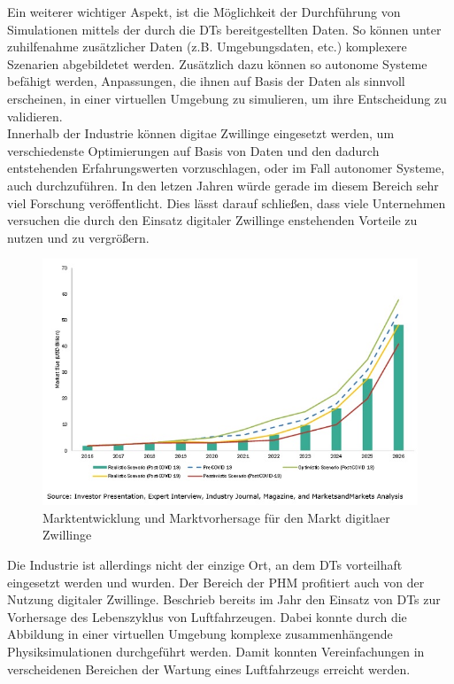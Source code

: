 Ein weiterer wichtiger Aspekt, ist die Möglichkeit der Durchführung von Simulationen mittels der durch die \ac{DT}s bereitgestellten Daten. So können unter zuhilfenahme zusätzlicher Daten (z.B. Umgebungsdaten, etc.) komplexere Szenarien abgebildetet werden. Zusätzlich dazu können so autonome Systeme befähigt werden, Anpassungen, die ihnen auf Basis der Daten als sinnvoll erscheinen, in einer virtuellen Umgebung zu simulieren, um ihre Entscheidung zu validieren. \autocite{rosen2015importance}\\
Innerhalb der Industrie können digitae Zwillinge eingesetzt werden, um verschiedenste Optimierungen auf Basis von Daten und den dadurch entstehenden Erfahrungswerten vorzuschlagen, oder im Fall autonomer Systeme, auch durchzuführen. In den letzen Jahren würde gerade im diesem Bereich sehr viel Forschung veröffentlicht. \autocite[S. 167657]{barricelli2019survey} Dies lässt darauf schließen, dass viele Unternehmen versuchen die durch den Einsatz digitaler Zwillinge enstehenden Vorteile zu nutzen und zu vergrößern. 

\begin{figure}[h]
    \centering
    \includegraphics[width=1.0\linewidth]{img/digital-twin-market12.jpg}
    \caption[Übersicht Marktgröße \ac{DT}]{Marktentwicklung und Marktvorhersage für den Markt digitlaer Zwillinge \autocite{markets2020}}
\end{figure}


Die Industrie ist allerdings nicht der einzige Ort, an dem \ac{DT}s vorteilhaft eingesetzt werden und wurden. Der Bereich der \ac{PHM} profitiert auch von der Nutzung digitaler Zwillinge. \citeauthor{tuegel2011reengineering} Beschrieb bereits im Jahr \citeyear{tuegel2011reengineering} den Einsatz von \ac{DT}s zur Vorhersage des Lebenszyklus von Luftfahrzeugen. Dabei konnte durch die Abbildung in einer virtuellen Umgebung komplexe zusammenhängende Physiksimulationen durchgeführt werden. Damit konnten Vereinfachungen in verscheidenen Bereichen der Wartung eines Luftfahrzeugs erreicht werden.\autocites{tao2018digital}{tuegel2011reengineering}

